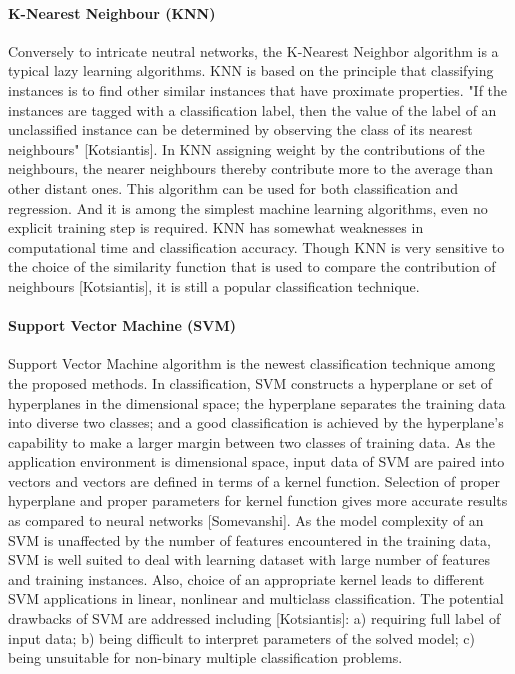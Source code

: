 \documentclass[runningheads]{llncs}
\begin{document}
\paragraph{K-Nearest Neighbour (KNN)\\}
Conversely to intricate neutral networks, the K-Nearest Neighbor algorithm is a typical lazy learning algorithms. KNN is based on the principle that classifying instances is to find other similar instances that have proximate properties. "If the instances are tagged with a classification label, then the value of the label of an unclassified instance can be determined by observing the class of its nearest neighbours" [Kotsiantis].  In KNN assigning weight by the contributions of the neighbours, the nearer neighbours thereby contribute more to the average than other distant ones. This algorithm can be used for both classification and regression. And it is among the simplest machine learning algorithms, even no explicit training step is required. KNN has somewhat weaknesses in computational time and classification accuracy. Though KNN is very sensitive to the choice of the similarity function that is used to compare the contribution of neighbours [Kotsiantis], it is still a popular classification technique.

\paragraph{Support Vector Machine (SVM)\\}
Support Vector Machine algorithm is the newest classification technique among the proposed methods. In classification, SVM constructs a hyperplane or set of hyperplanes in the dimensional space; the hyperplane separates the training data into diverse two classes; and a good classification is achieved by the hyperplane's capability to make a larger margin between two classes of training data. As the application environment is dimensional space, input data of SVM are paired into vectors and vectors are defined in terms of a kernel function. Selection of proper hyperplane and proper parameters for kernel function gives more accurate results as compared to neural networks [Somevanshi]. As the model complexity of an SVM is unaffected by the number of features encountered in the training data, SVM is well suited to deal with learning dataset with large number of features and training instances. Also, choice of an appropriate kernel leads to different SVM applications in linear, nonlinear and multiclass classification. The potential drawbacks of SVM are addressed including [Kotsiantis]: a) requiring full label of input data; b) being difficult to interpret parameters of the solved model; c) being unsuitable for non-binary multiple classification problems.
%
%
\end{document}
